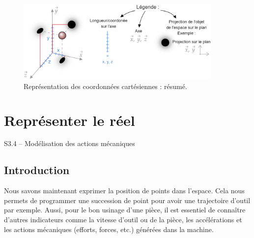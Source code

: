\documentclass[
	11pt, %
	fleqn, %
	a4paper, %
]{LegrandOrangeBook}
\begin{document}
\begin{figure}[H] %
	\centering %
	\includegraphics[width=0.9\textwidth]{Images/coord10.png} %
	\caption{Représentation des coordonnées cartésiennes : résumé.}
	\label{coord10} %
\end{figure}



\chapterspaceabove{6.25cm} %
\chapterspacebelow{7.5cm} %

\chapter{Représenter le réel}

\begin{corollary}
S3.4 – Modélisation des actions mécaniques
\end{corollary}

\section{Introduction}
Nous savons maintenant exprimer la position de points dans l'espace. Cela nous permets de programmer une succession de point pour avoir une trajectoire d'outil par exemple. Aussi, pour le bon usinage d'une pièce, il est essentiel de connaître d'autres indicateurs comme la vitesse d'outil ou de la pièce, les accélérations et les actions mécaniques (efforts, forces, etc.) générées dans la machine.
\end{document}
